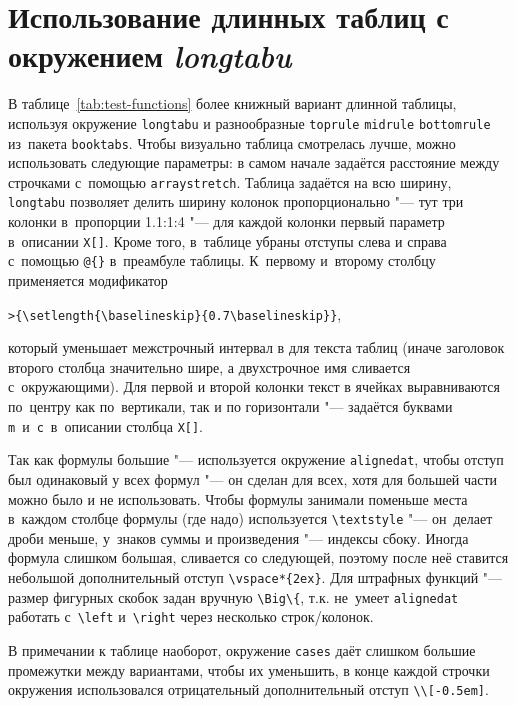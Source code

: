 \section{Использование длинных таблиц с окружением \textit{longtabu}}\label{app:B2a}

В таблице~\ref{tab:test-functions} более книжный вариант
длинной таблицы, используя окружение \verb!longtabu! и разнообразные
\verb!toprule! \verb!midrule! \verb!bottomrule! из~пакета
\verb!booktabs!. Чтобы визуально таблица смотрелась лучше, можно
использовать следующие параметры: в самом начале задаётся расстояние
между строчками с~помощью \verb!arraystretch!. Таблица задаётся на
всю ширину, \verb!longtabu! позволяет делить ширину колонок
пропорционально "--- тут три колонки в~пропорции 1.1:1:4 "--- для каждой
колонки первый параметр в~описании \verb!X[]!. Кроме того, в~таблице
убраны отступы слева и справа с~помощью \verb!@{}!
в~преамбуле таблицы. К~первому и~второму столбцу применяется
модификатор

\verb!>{\setlength{\baselineskip}{0.7\baselineskip}}!,

\noindent который уменьшает межстрочный интервал в для текста таблиц (иначе
заголовок второго столбца значительно шире, а двухстрочное имя
сливается с~окружающими). Для первой и второй колонки текст в ячейках
выравниваются по~центру как по~вертикали, так и по горизонтали "---
задаётся буквами \verb!m!~и~\verb!c!~в~описании столбца \verb!X[]!.

Так как формулы большие "--- используется окружение \verb!alignedat!,
чтобы отступ был одинаковый у всех формул "--- он сделан для всех, хотя
для большей части можно было и не использовать.  Чтобы формулы
занимали поменьше места в~каждом столбце формулы (где надо)
используется \verb!\textstyle! "--- он~делает дроби меньше, у~знаков
суммы и произведения "--- индексы сбоку. Иногда формула слишком большая,
сливается со следующей, поэтому после неё ставится небольшой
дополнительный отступ \verb!\vspace*{2ex}!. Для штрафных функций "---
размер фигурных скобок задан вручную \verb!\Big\{!, т.\:к. не~умеет
\verb!alignedat! работать с~\verb!\left! и~\verb!\right! через
несколько строк/колонок.

В примечании к таблице наоборот, окружение \verb!cases! даёт слишком
большие промежутки между вариантами, чтобы их уменьшить, в конце
каждой строчки окружения использовался отрицательный дополнительный
отступ \verb!\\[-0.5em]!.

